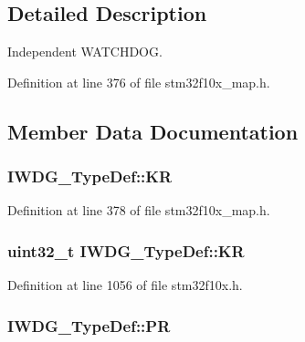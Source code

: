 \subsection{Detailed Description}
Independent W\+A\+T\+C\+H\+D\+OG. 

Definition at line 376 of file stm32f10x\+\_\+map.\+h.



\subsection{Member Data Documentation}
\subsubsection[{\texorpdfstring{KR}{KR}}]{ I\+W\+D\+G\+\_\+\+Type\+Def\+::\+KR}\hypertarget{struct_i_w_d_g___type_def_ac8920afdfd534474b3ad53d5c80e893c}{}\label{struct_i_w_d_g___type_def_ac8920afdfd534474b3ad53d5c80e893c}


Definition at line 378 of file stm32f10x\+\_\+map.\+h.

\subsubsection[{\texorpdfstring{KR}{KR}}]{ {\bf uint32\+\_\+t} I\+W\+D\+G\+\_\+\+Type\+Def\+::\+KR}\hypertarget{struct_i_w_d_g___type_def_a63089aaa5f4ad34ee2677ebcdee49cd9}{}\label{struct_i_w_d_g___type_def_a63089aaa5f4ad34ee2677ebcdee49cd9}


Definition at line 1056 of file stm32f10x.\+h.

\subsubsection[{\texorpdfstring{PR}{PR}}]{ I\+W\+D\+G\+\_\+\+Type\+Def\+::\+PR}\hypertarget{struct_i_w_d_g___type_def_ac9f41bee7457da9f9e4891104b741659}{}\label{struct_i_w_d_g___type_def_ac9f41bee7457da9f9e4891104b741659}


